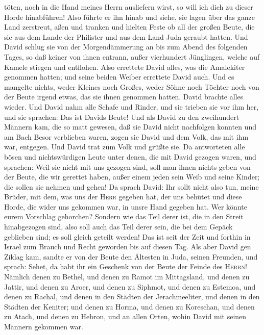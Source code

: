 töten, noch in die Hand meines Herrn ausliefern wirst, so will ich dich
zu dieser Horde hinabführen!  Also führte er ihn hinab
und siehe, sie lagen über das ganze Land zerstreut, aßen und tranken und
hielten Feste ob all der großen Beute, die sie aus dem Lande der
Philister und aus dem Land Juda geraubt hatten.  Und
David schlug sie von der Morgendämmerung an bis zum Abend des folgenden
Tages, so daß keiner von ihnen entrann, außer vierhundert Jünglingen,
welche auf Kamele stiegen und entflohen.  Also errettete
David alles, was die Amalekiter genommen hatten; und seine beiden Weiber
errettete David auch.  Und es mangelte nichts, weder
Kleines noch Großes, weder Söhne noch Töchter noch von der Beute irgend
etwas, das sie ihnen genommen hatten. David brachte alles wieder.
 Und David nahm alle Schafe und Rinder, und sie trieben
sie vor ihm her, und sie sprachen: Das ist Davids Beute! 
Und als David zu den zweihundert Männern kam, die so matt gewesen, daß
sie David nicht nachfolgen konnten und am Bach Besor verblieben waren,
zogen sie David und dem Volk, das mit ihm war, entgegen. Und David trat
zum Volk und grüßte sie.  Da antworteten alle bösen und
nichtswürdigen Leute unter denen, die mit David gezogen waren, und
sprachen: Weil sie nicht mit uns gezogen sind, soll man ihnen nichts
geben von der Beute, die wir gerettet haben, außer einem jeden sein Weib
und seine Kinder; die sollen sie nehmen und gehen!  Da
sprach David: Ihr sollt nicht also tun, meine Brüder, mit dem, was uns
der \textsc{Herr} gegeben hat, der uns behütet und diese Horde, die
wider uns gekommen war, in unsre Hand gegeben hat.  Wer
könnte eurem Vorschlag gehorchen? Sondern wie das Teil derer ist, die in
den Streit hinabgezogen sind, also soll auch das Teil derer sein, die
bei dem Gepäck geblieben sind; es soll gleich geteilt werden!
 Das ist seit der Zeit und forthin in Israel zum Brauch
und Recht geworden bis auf diesen Tag.  Als aber David
gen Ziklag kam, sandte er von der Beute den Ältesten in Juda, seinen
Freunden, und sprach: Sehet, da habt ihr ein Geschenk von der Beute der
Feinde des \textsc{Herrn}!  Nämlich denen zu Bethel, und
denen zu Ramot im Mittagsland, und denen zu Jattir,  und
denen zu Aroer, und denen zu Siphmot, und denen zu Estemoa,
 und denen zu Rachal, und denen in den Städten der
Jerachmeeliter, und denen in den Städten der Keniter; 
und denen zu Horma, und denen zu Koreschan, und denen zu Atach,
 und denen zu Hebron, und an allen Orten, wohin David mit
seinen Männern gekommen war.


